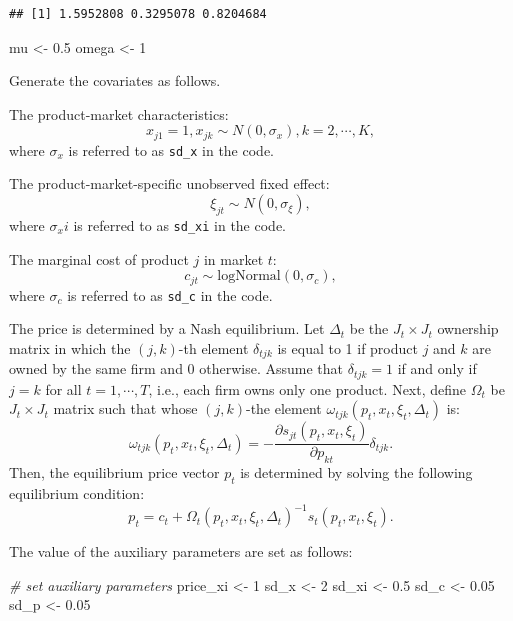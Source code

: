 \documentclass[]{book}
\newenvironment{Shaded}{\begin{snugshade}}{\end{snugshade}}
\newcommand{\DecValTok}[1]{\textcolor[rgb]{0.00,0.00,0.81}{#1}}
\newcommand{\FloatTok}[1]{\textcolor[rgb]{0.00,0.00,0.81}{#1}}
\newcommand{\StringTok}[1]{\textcolor[rgb]{0.31,0.60,0.02}{#1}}
\newcommand{\CommentTok}[1]{\textcolor[rgb]{0.56,0.35,0.01}{\textit{#1}}}
\newcommand{\NormalTok}[1]{#1}
\begin{document}
\begin{verbatim}
## [1] 1.5952808 0.3295078 0.8204684
\end{verbatim}

\begin{Shaded}
\begin{Highlighting}[]
\NormalTok{mu <-}\StringTok{ }\FloatTok{0.5}
\NormalTok{omega <-}\StringTok{ }\DecValTok{1}
\end{Highlighting}
\end{Shaded}

Generate the covariates as follows.

The product-market characteristics: \[
x_{j1} = 1, x_{jk} \sim N(0, \sigma_x), k = 2, \cdots, K,
\] where \(\sigma_x\) is referred to as \texttt{sd\_x} in the code.

The product-market-specific unobserved fixed effect: \[
\xi_{jt} \sim N(0, \sigma_\xi),
\] where \(\sigma_xi\) is referred to as \texttt{sd\_xi} in the code.

The marginal cost of product \(j\) in market \(t\): \[
c_{jt} \sim \text{logNormal}(0, \sigma_c),
\] where \(\sigma_c\) is referred to as \texttt{sd\_c} in the code.

The price is determined by a Nash equilibrium. Let \(\Delta_t\) be the
\(J_t \times J_t\) ownership matrix in which the \((j, k)\)-th element
\(\delta_{tjk}\) is equal to 1 if product \(j\) and \(k\) are owned by
the same firm and 0 otherwise. Assume that \(\delta_{tjk} = 1\) if and
only if \(j = k\) for all \(t = 1, \cdots, T\), i.e., each firm owns
only one product. Next, define \(\Omega_t\) be \(J_t \times J_t\) matrix
such that whose \((j, k)\)-the element
\(\omega_{tjk}(p_t, x_t, \xi_t, \Delta_t)\) is: \[
\omega_{tjk}(p_t, x_t, \xi_t, \Delta_t) = - \frac{\partial s_{jt}(p_t, x_t, \xi_t)}{\partial p_{kt}} \delta_{tjk}.
\] Then, the equilibrium price vector \(p_t\) is determined by solving
the following equilibrium condition: \[
p_t = c_t + \Omega_t(p_t, x_t, \xi_t, \Delta_t)^{-1} s_t(p_t, x_t, \xi_t).
\]

The value of the auxiliary parameters are set as follows:

\begin{Shaded}
\begin{Highlighting}[]
\CommentTok{# set auxiliary parameters}
\NormalTok{price_xi <-}\StringTok{ }\DecValTok{1}
\NormalTok{sd_x <-}\StringTok{ }\DecValTok{2}
\NormalTok{sd_xi <-}\StringTok{ }\FloatTok{0.5}
\NormalTok{sd_c <-}\StringTok{ }\FloatTok{0.05}
\NormalTok{sd_p <-}\StringTok{ }\FloatTok{0.05}
\end{Highlighting}
\end{Shaded}
\end{document}
